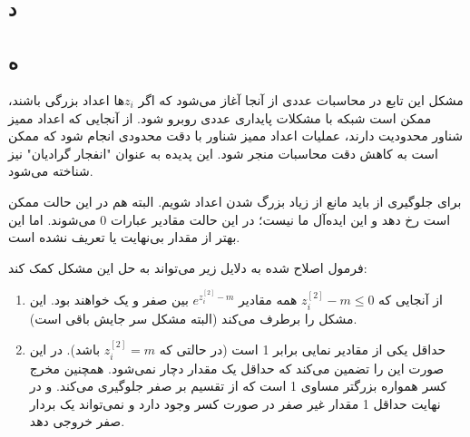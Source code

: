 \documentclass{article}
\begin{document}
\subsection{د}

\subsection{ه}
مشکل این تابع در محاسبات عددی از آنجا آغاز می‌شود که اگر $z_i$ها اعداد بزرگی باشند، ممکن است شبکه با مشکلات پایداری عددی روبرو شود. از آنجایی که اعداد ممیز شناور محدودیت دارند، عملیات اعداد ممیز شناور با دقت محدودی انجام شود که ممکن است به کاهش دقت محاسبات منجر شود. این پدیده به عنوان "انفجار گرادیان" نیز شناخته می‌شود.

برای جلوگیری از  باید مانع از زیاد بزرگ شدن اعداد شویم. البته  هم در این حالت ممکن است رخ دهد و این ایده‌آل ما نیست؛ در این حالت مقادیر عبارات 0 می‌شوند. اما این بهتر از مقدار بی‌نهایت یا تعریف نشده است.

فرمول اصلاح شده به دلایل زیر می‌تواند به حل این مشکل کمک کند:
\begin{enumerate}
\item از آنجایی که
$z^{[2]}_i - m \le 0$
همه مقادیر
$e ^ {z ^ {[2]}_i - m}$
بین صفر و یک خواهند بود. این مشکل  را برطرف می‌کند (البته مشکل  سر جایش باقی است).
\item حداقل یکی از مقادیر نمایی برابر 1 است (در حالتی که
$z^{[2]}_i = m$
باشد). در این صورت این را تضمین می‌کند که حداقل یک مقدار دچار  نمی‌شود. همچنین مخرج کسر همواره بزرگتر مساوی 1 است که از تقسیم بر صفر جلوگیری می‌کند. و در نهایت حداقل 1 مقدار غیر صفر در صورت کسر وجود دارد و  نمی‌تواند یک بردار صفر خروجی دهد.
\end{enumerate}


\section{}
\end{document}
